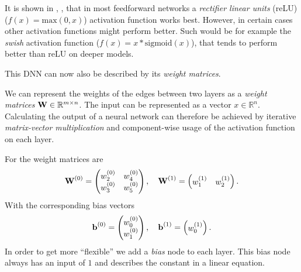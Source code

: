 It is shown in  \cite{Nair-Hinton}, \cite{inproceedings}, that in most feedforward networks a \emph{rectifier linear units} (reLU) (\(f(x) = \text{max}(0, x)\)) activation function works best.
However, in certain cases other activation functions might perform better.
Such would be for example the \emph{swish} activation function (\(f(x) = x * \text{sigmoid}(x)\)), that tends to perform better than reLU on deeper models. \cite{DBLP:journals/corr/abs-1710-05941}



This DNN  can now also be described by its \emph{weight matrices}. 

We can represent the weights of the edges between two layers as a \emph{weight matrices} \(\textbf{W} \in \mathbb{R}^{m \times n}\).
The input can be represented as a vector \({x \in \mathbb{R}^n}\).
Calculating the output of a neural network can therefore be achieved by iterative \emph{matrix-vector multiplication} and component-wise usage of the activation function on each layer.

For  the weight matrices are
\begin{equation}
    \textbf{W}^{(0)} =
    \begin{pmatrix}
        w_{2}^{(0)} & w_{4}^{(0)} \\
        w_{3}^{(0)} & w_{5}^{(0)}
    \end{pmatrix}, \quad
    \textbf{W}^{(1)} = 
    \begin{pmatrix}
        w_{1}^{(1)} & w_{2}^{(1)}
    \end{pmatrix}.
\end{equation}
With the corresponding bias vectors
\begin{equation}
    \textbf{b}^{(0)} =
    \begin{pmatrix}
        w_{0}^{(0)} \\
        w_{1}^{(0)}
    \end{pmatrix}, \quad
    \textbf{b}^{(1)} =
    \begin{pmatrix}
        w_{0}^{(1)}
    \end{pmatrix}.
\end{equation}
In order to get more \enquote{flexible} we add a \emph{bias} node to each layer.
This bias node always has an input of \(1\) and describes the constant in a linear equation.

